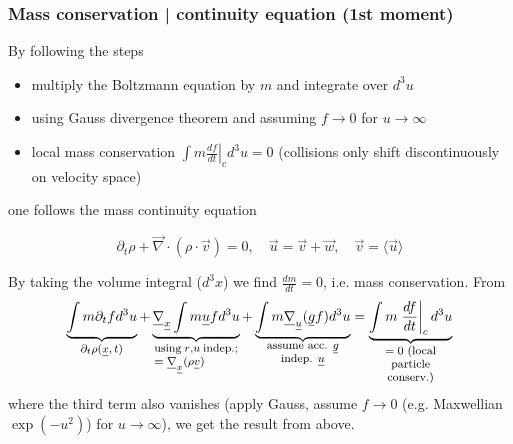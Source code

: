 \subsubsection{Mass conservation | continuity equation (1st moment)}
By following the steps
\begin{itemize}
    \item multiply the Boltzmann equation by $m$ and integrate over $d^3u$
    \item using Gauss divergence theorem and assuming $f \rightarrow 0$ for $u \rightarrow \infty$
    \item local mass conservation $\int m \left. \frac{df}{dt} \right|_c d^3u = 0$ (collisions only shift discontinuously on velocity space)
\end{itemize}
one follows the mass continuity equation
\begin{mdframed}[style = padded]
\begin{equation}
    \partial_t\rho + \vec{\nabla} \cdot (\rho \cdot \vec{v}) = 0, \quad \vec{u} = \vec{v} + \vec{w}, \quad \vec{v} = \langle \vec{u} \rangle
\end{equation}
\end{mdframed}
By taking the volume integral ($d^3x$) we find $\frac{dm}{dt} = 0$, i.e. mass conservation.
From
\begin{equation}
    \explain{\int m \partial_t f d^3u}{$\partial_t\rho(\vec{x},t)$} + \underbrace{\vec{\nabla}_\vec{x} \int m \vec{u} f d^3u}_{\parbox{6em}{\footnotesize using $r$,$u$ indep.; $=\vec{\nabla}_\vec{x} (\rho \vec{v})$}} + \explain{\int m \vec{\nabla}_\vec{u} (\vec{g} f) d^3 u}{assume acc. $\vec{g}$ indep. $\vec{u}$} = \explain{\int m \left. \frac{df}{dt} \right|_c d^3u}{$=0$ (local particle conserv.)}
\end{equation}
where the third term also vanishes (apply Gauss, assume $f \rightarrow 0$ (e.g. Maxwellian $\exp(-u^2)$) for $u \rightarrow \infty$), we get the result from above.

